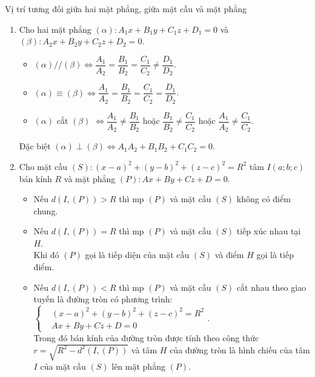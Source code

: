 \begin{dang}{Vị trí tương đối giữa hai mặt phẳng, giữa mặt cầu và mặt phẳng}
	\begin{enumerate}
		\item Cho hai mặt phẳng $\left(\alpha\right): A_1x+B_1y+C_1z+D_1=0$ và $\left(\beta\right): A_2x+B_2y+C_2z+D_2=0$.
	\begin{itemize}
		\item $\left(\alpha\right)//\left(\beta\right)\Leftrightarrow\dfrac{A_1}{A_2}=\dfrac{B_1}{B_2}=\dfrac{C_1}{C_2}\neq\dfrac{D_1}{D_2}$.
		\item $\left(\alpha\right)\equiv\left(\beta\right)\Leftrightarrow\dfrac{A_1}{A_2}=\dfrac{B_1}{B_2}=\dfrac{C_1}{C_2}=\dfrac{D_1}{D_2}$.
		\item $\left(\alpha\right)$ cắt $\left(\beta\right)$ $\Leftrightarrow \dfrac{A_1}{A_2}\neq \dfrac{B_1}{B_2}$ hoặc $\dfrac{B_1}{B_2}\neq \dfrac{C_1}{C_2}$ hoặc $\dfrac{A_1}{A_2}\neq \dfrac{C_1}{C_2}$.
	\end{itemize}
\begin{note}
	Đặc biệt $\left(\alpha\right)\perp \left(\beta\right)\Leftrightarrow A_1A_2+B_1B_2+C_1C_2=0$.
\end{note}
		\item Cho mặt cầu $\left(S\right): \left(x-a\right)^2+\left(y-b\right)^2+\left(z-c\right)^2=R^2$ tâm $I\left(a;b;c\right)$ bán kính $R$ và mặt phẳng $\left(P\right): Ax+By+Cz+D=0$.
	\begin{itemize}
		\item Nếu $d\left(I,\left(P\right)\right)>R$ thì mp $\left(P\right)$ và mặt cầu $\left(S\right)$ không có điểm chung.
		\item Nếu $d\left(I,\left(P\right)\right)=R$ thì mp $\left(P\right)$ và mặt cầu $\left(S\right)$ tiếp xúc nhau tại $H$.\\ Khi đó $\left(P\right)$ gọi là tiếp diện của mặt cầu $\left(S\right)$ và điểm $H$ gọi là tiếp điểm.
		\item Nếu $d\left(I,\left(P\right)\right)<R$ thì mp $\left(P\right)$ và mặt cầu $\left(S\right)$ cắt nhau theo giao tuyến là đường tròn có phương trình: $\left\{
		\begin{aligned}
		&\left(x-a\right)^2+\left(y-b\right)^2+\left(z-c\right)^2=R^2\\
		&Ax+By+Cz+D=0
		\end{aligned}
		\right.$.\\
		Trong đó bán kính của đường tròn được tính theo công thức $r=\sqrt{R^2-d^2\left(I,\left(P\right)\right)}$ và tâm $H$ của đường tròn là  hình chiếu của tâm $I$ của mặt cầu $\left(S\right)$ lên mặt phẳng $\left(P\right)$.
	\end{itemize}
	
	\end{enumerate}
\end{dang}
\setcounter{subsubsection}{0}
\setcounter{vd}{0}
\setcounter{bt}{0}
\setcounter{ex}{0}
